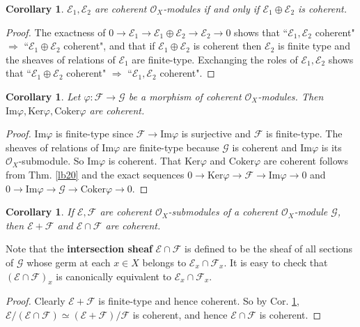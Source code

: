 \documentclass[12pt,b5paper,notitlepage]{report}
\theoremstyle{definition}
\theoremstyle{plain}
\newtheorem{co}[df]{Corollary}
\newcommand{\scr}{\mathscr}
\newcommand{\Ker}{\mathrm{Ker}}
\newcommand{\Cok}{\mathrm{Coker}}
\newcommand{\Imag}{\mathrm{Im}}
\numberwithin{equation}{section}
\begin{document}
\begin{co}\label{lb45}
$\scr E_1,\scr E_2$ are coherent $\scr O_X$-modules if and only if $\scr E_1\oplus\scr E_2$ is coherent.
\end{co}
\begin{proof}
The exactness of $0\rightarrow\scr E_1\rightarrow\scr E_1\oplus\scr E_2\rightarrow\scr E_2\rightarrow0$ shows that ``$\scr E_1,\scr E_2$ coherent" $\Rightarrow$ ``$\scr E_1\oplus\scr E_2$ coherent", and that if $\scr E_1\oplus\scr E_2$ is coherent then $\scr E_2$ is finite type and the sheaves of relations of $\scr E_1$ are finite-type. Exchanging the roles of $\scr E_1,\scr E_2$ shows that  ``$\scr E_1\oplus\scr E_2$ coherent" $\Rightarrow$ ``$\scr E_1,\scr E_2$ coherent".
\end{proof}


\begin{co}\label{lb46}
Let $\varphi:\scr F\rightarrow\scr G$ be a morphism of coherent $\scr O_X$-modules. Then $\Imag\varphi,\Ker\varphi,\Cok\varphi$ are coherent.
\end{co}

\begin{proof}
$\Imag\varphi$ is finite-type since  $\scr F\rightarrow\Imag\varphi$ is surjective and $\scr F$ is finite-type. The sheaves of relations of $\Imag\varphi$ are finite-type because $\scr G$ is coherent and $\Imag\varphi$ is its $\scr O_X$-submodule. So $\Imag\varphi$ is coherent. That $\Ker\varphi$ and $\Cok\varphi$ are coherent follows from Thm. \ref{lb20} and the exact sequences $0\rightarrow\Ker\varphi\rightarrow\scr F\rightarrow\Imag\varphi\rightarrow0$ and $0\rightarrow\Imag\varphi\rightarrow\scr G\rightarrow\Cok\varphi\rightarrow0$.
\end{proof}


\begin{co}\label{lb110}
If $\scr E,\scr F$ are coherent $\scr O_X$-submodules of a coherent $\scr O_X$-module $\scr G$, then $\scr E+\scr F$ and $\scr E\cap\scr F$ are coherent.
\end{co}

Note that the \textbf{intersection sheaf}  $\scr E\cap\scr F$ is defined to be the sheaf of all sections of $\scr G$ whose germ at each $x\in X$ belongs to $\scr E_x\cap\scr F_x$. It is easy to check that $(\scr E\cap\scr F)_x$ is canonically equivalent to $\scr E_x\cap\scr F_x$.

\begin{proof}
Clearly $\scr E+\scr F$ is finite-type and hence coherent. So by Cor. \ref{lb46}, $\scr E/(\scr E\cap\scr F)\simeq(\scr E+\scr F)/\scr F$ is coherent, and hence $\scr E\cap\scr F$ is coherent.
\end{proof}
\end{document}
